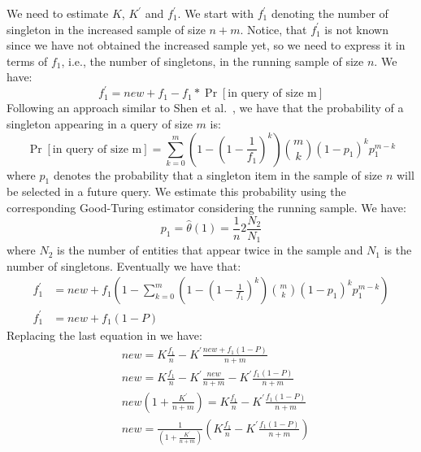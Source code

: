 \documentclass{vldb}
\begin{document}
We need to estimate $K$, $K^{\prime}$ and $f^{\prime}_1$. We start with $f^{\prime}_1$ denoting the number of singleton in the increased sample of size $n+m$. Notice, that $f^{\prime}_1$ is not known since we have not obtained the increased sample yet, so we need to express it in terms of $f_1$, i.e., the number of singletons, in the running sample of size $n$. We have:
\begin{equation}
f^{\prime}_1 = new + f_1 - f_1*\Pr[\mbox{in query of size m}]
\end{equation}
Following an approach similar to Shen et al.~\cite{shen:2003}, we have that the probability of a singleton appearing in a query of size $m$ is:
\begin{equation}
\Pr[\mbox{in query of size m}] = \sum_{k=0}^m(1-(1-\frac{1}{f_1})^k) {m \choose k}(1-p_1)^k p_1^{m-k}
\end{equation}
where $p_1$ denotes the probability that a singleton item in the sample of size $n$ will be selected in a future query. We estimate this probability using the corresponding Good-Turing estimator considering the running sample. We have:
\begin{equation}
p_1 = \hat{\theta}(1) = \frac{1}{n}2\frac{N_2}{N_1}
\end{equation} 
where $N_2$ is the number of entities that appear twice in the sample and $N_1$ is the number of singletons. 
Eventually we have that:
\begin{align}
f^{\prime}_1 &= new + f_1(1- \sum_{k=0}^m(1-(1-\frac{1}{f_1})^k) {m \choose k}(1-p_1)^k p_1^{m-k}) \nonumber \\
f^{\prime}_1 &= new + f_1(1- P)
\end{align}
Replacing the last equation in  we have:
\begin{align}
&new = K\frac{f_1}{n} - K^{\prime}\frac{new + f_1(1- P)}{n+m} \nonumber \\
&new = K\frac{f_1}{n} - K^{\prime}\frac{new}{n+m} - K^{\prime}\frac{f_1(1- P)}{n+m} \nonumber \\
&new(1 + \frac{K^{\prime}}{n+m}) = K\frac{f_1}{n} - K^{\prime}\frac{f_1(1- P)}{n+m} \nonumber \\
&new = \frac{1}{(1 + \frac{K^{\prime}}{n+m})}(K\frac{f_1}{n} - K^{\prime}\frac{f_1(1- P)}{n+m}) \nonumber
\end{align}
\end{document}
